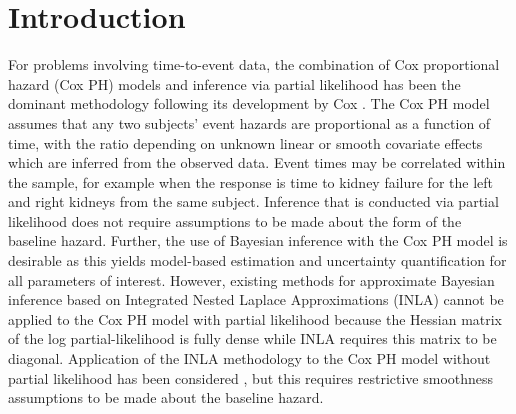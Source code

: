 \documentclass[ba]{imsart}
\begin{document}






%


\section{Introduction}\label{sec1}
For problems involving time-to-event data, the combination of Cox proportional hazard (Cox PH) models and inference via partial likelihood has been the dominant methodology following its development by Cox \citep{coxph}. The Cox PH model assumes that any two subjects' event hazards are proportional as a function of time, with the ratio depending on unknown linear or smooth covariate effects which are inferred from the observed data. Event times may be correlated within the sample, for example when the response is time to kidney failure for the left and right kidneys from the same subject. Inference that is conducted via partial likelihood does not require assumptions to be made about the form of the baseline hazard. Further, the use of Bayesian inference with the Cox PH model is desirable as this yields model-based estimation and uncertainty quantification for all parameters of interest. However, existing methods for approximate Bayesian inference based on Integrated Nested Laplace Approximations (INLA) \citep{inla} cannot be applied to the Cox PH model with partial likelihood because the Hessian matrix of the log partial-likelihood is fully dense while INLA requires this matrix to be diagonal. Application of the INLA methodology to the Cox PH model without partial likelihood has been considered \citep{inlacoxph}, but this requires restrictive smoothness assumptions to be made about the baseline hazard.
\end{document}
